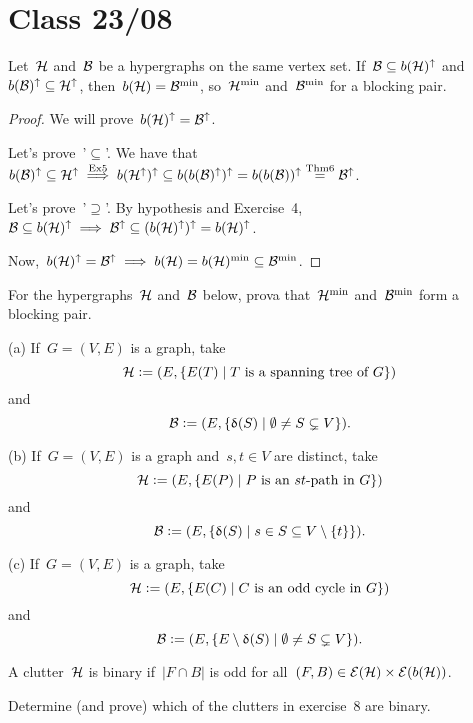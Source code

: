 \documentclass[main.tex]{subfiles}
\begin{document}
\chapter*{Class 23/08}

\begin{corollary}
	Let~$\mathcal{H}$ and~$\mathcal{B}$ be a hypergraphs on the same vertex set. If~${\mathcal{B} \subseteq b(\mathcal{H})^\uparrow}$ and~${b(\mathcal{B})^\uparrow \subseteq \mathcal{H}^\uparrow}$, then~${b(\mathcal{H}) = \mathcal{B}^{\min}}$, so~$\mathcal{H}^{\min}$ and~$\mathcal{B}^{\min}$ for a blocking pair.
\end{corollary}
\begin{proof}
	We will prove~$b(\mathcal{H})^\uparrow = \mathcal{B}^\uparrow$.

	Let's prove~'$\subseteq$'. We have that~$b(\mathcal{B})^\uparrow \subseteq \mathcal{H}^\uparrow \stackrel{\text{Ex5}}{\implies} b(\mathcal{H}^\uparrow)^\uparrow \subseteq b(b(\mathcal{B})^\uparrow)^\uparrow = b(b(\mathcal{B}))^\uparrow \stackrel{\text{Thm6}}{=} \mathcal{B}^\uparrow$.

	Let's prove~'$\supseteq$'. By hypothesis and Exercise~4,~$\mathcal{B} \subseteq b(\mathcal{H})^\uparrow \implies \mathcal{B}^\uparrow \subseteq (b(\mathcal{H})^\uparrow)^\uparrow = b(\mathcal{H})^\uparrow$.

	Now,~$b(\mathcal{H})^\uparrow = \mathcal{B}^\uparrow \implies b(\mathcal{H}) = b(\mathcal{H})^{\min} \subseteq \mathcal{B}^{\min}$.
\end{proof}

\begin{exercise}
	For the hypergraphs~$\mathcal{H}$ and~$\mathcal{B}$ below, prova that~$\mathcal{H}^{\min}$ and~$\mathcal{B}^{\min}$ form a blocking pair.

	(a) If~$G = (V, E)$ is a graph, take~$$\mathcal{H} \vcentcolon= (E, \{E(T) \mid T \text{ is a spanning tree of } G\})$$ and~$$\mathcal{B} \vcentcolon= (E, \{\updelta(S) \mid \emptyset \neq S \subsetneq V\}).$$

	(b) If~$G = (V, E)$ is a graph and~$s, t \in V$ are distinct, take
	$$ \mathcal{H} \vcentcolon= (E, \{E(P) \mid P \text { is an~$st$-path in~$G$}\}) $$
	and
	$$ \mathcal{B} \vcentcolon= (E, \{\updelta(S) \mid s \in S \subseteq V \setminus \{t\}\}).$$

	(c) If~$G = (V, E)$ is a graph, take
	$$ \mathcal{H} \vcentcolon= (E, \{E(C) \mid C \text { is an odd cycle in~$G$}\}) $$
	and
	$$ \mathcal{B} \vcentcolon= (E, \{E \setminus \updelta(S) \mid \emptyset \neq S \subsetneq V\}).$$
\end{exercise}

A clutter~$\mathcal{H}$ is binary if~$|F \cap B|$ is odd for all~$(F, B) \in \mathcal{E}(\mathcal{H}) \times \mathcal{E}(b(\mathcal{H}))$.

\begin{exercise}
	Determine (and prove) which of the clutters in exercise~8 are binary.
\end{exercise}
\end{document}
